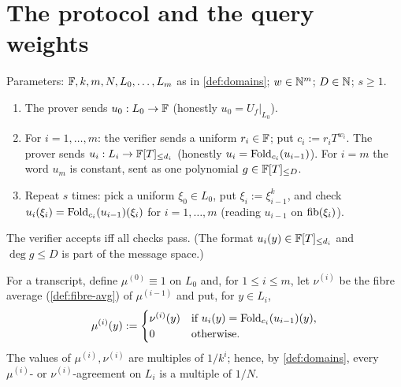 \section{The protocol and the query weights}

\begin{definition}\label{def:protocol}
Parameters: $\mathbb{F},k,m,N,L_0,\dots,L_m$ as in \cref{def:domains}; $w\in\mathbb{N}^m$; $D\in\mathbb{N}$;
$s\ge1$.
\begin{enumerate}
\item The prover sends $u_0:L_0\to\mathbb{F}$ (honestly $u_0=U_f|_{L_0}$).
\item For $i=1,\dots,m$: the verifier sends a uniform $r_i\in\mathbb{F}$; put $c_i:=r_iT^{w_i}$.
The prover sends $u_i:L_i\to\mathbb{F}[T]_{\le d_i}$ (honestly $u_i=\mathrm{Fold}_{c_i}(u_{i-1})$).
For $i=m$ the word $u_m$ is constant, sent as one polynomial $g\in\mathbb{F}[T]_{\le D}$.
\item Repeat $s$ times: pick a uniform $\xi_0\in L_0$, put $\xi_i:=\xi_{i-1}^k$, and check
$u_i(\xi_i)=\mathrm{Fold}_{c_i}(u_{i-1})(\xi_i)$ for $i=1,\dots,m$ (reading $u_{i-1}$ on
$\mathrm{fib}(\xi_i)$).
\end{enumerate}
The verifier accepts iff all checks pass. (The format $u_i(y)\in\mathbb{F}[T]_{\le d_i}$ and
$\deg g\le D$ is part of the message space.)
\end{definition}

\begin{definition}\label{def:weights}
For a transcript, define $\mu^{(0)}\equiv1$ on $L_0$ and, for $1\le i\le m$, let $\nu^{(i)}$ be
the fibre average (\cref{def:fibre-avg}) of $\mu^{(i-1)}$ and put, for $y\in L_i$,
\[
\mu^{(i)}(y):=\begin{cases}\nu^{(i)}(y)&\text{if }u_i(y)=\mathrm{Fold}_{c_i}(u_{i-1})(y),\\0&\text{otherwise.}\end{cases}
\]
The values of $\mu^{(i)},\nu^{(i)}$ are multiples of $1/k^i$; hence, by \cref{def:domains},
every $\mu^{(i)}$- or $\nu^{(i)}$-agreement on $L_i$ is a multiple of $1/N$.
\end{definition}

